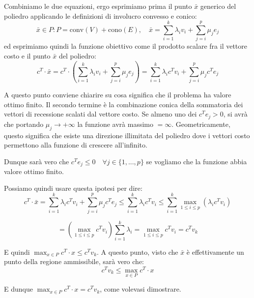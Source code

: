 \documentclass[a4paper,11pt]{article}
\begin{document}
Combiniamo le due equazioni, ergo esprimiamo prima il punto $\bar{x}$ generico del poliedro applicando le definizioni di involucro convesso e conico:
$$
\bar{x} \in P : P = \mathrm{conv}(V) + \mathrm{cono}(E), \quad \bar{x} = \sum_{i=1}^k \lambda_i v_i + \sum_{j=i}^p \mu_j e_j
$$
ed esprimiamo quindi la funzione obiettivo come il prodotto scalare fra il vettore costo e il punto $\bar{x}$ del poliedro:
$$
c^T \cdot \bar{x} = c^T \cdot \left( \sum_{i=1}^k \lambda_i v_i + \sum_{j=i}^p \mu_j e_j \right) = \sum_{i=1}^k \lambda_i c^T v_i + \sum_{j=i}^p \mu_j c^T e_j
$$

A questo punto conviene chiarire su cosa significa che il problema ha valore ottimo finito.
Il secondo termine è la combinazione conica della sommatoria dei vettori di recessione scalati dal vettore costo.
Se almeno uno dei $c^T e_j > 0$, si avrà che portando $\mu_j \rightarrow +\infty$ la funzione avrà massimo $= \infty$.
Geometricamente, questo significa che esiste una direzione illimitata del poliedro dove i vettori costo permettono alla funzione di crescere all'infinito.

Dunque sarà vero che $c^T e_j \leq 0 \quad \forall j \in \{ 1, ..., p \}$ se vogliamo che la funzione abbia valore ottimo finito.

Possiamo quindi usare questa ipotesi per dire:
$$
c^T \cdot \bar{x} = \sum_{i=1}^k \lambda_i c^T v_i + \sum_{j=i}^p \mu_j c^T e_j \leq \sum_{i=1}^k \lambda_i c^T v_i \leq \sum_{i=1}^k \max_{1 \leq i \leq p} \left(\lambda_i c^T v_i\right) 
$$

$$
= \left( \max_{1 \leq i \leq p} c^T v_i\right) \sum_{i=1}^k \lambda_i = \max_{1\leq i \leq p} c^Tv_i = c^T v_k
$$

E quindi $\max_{x \in P} c^T \cdot x \leq c^T v_k$.
A questo punto, visto che $\bar{x}$ è effettivamente un punto della regione ammissibile, sarà vero che:
$$
c^Tv_k \leq \max_{x \in P} c^T \cdot x
$$

E dunque $\max_{x \in P} c^T \cdot x = c^T v_k$, come volevasi dimostrare. 
\end{document}
